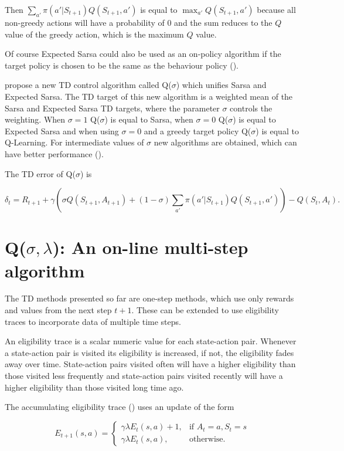 \documentclass{article} %
\begin{document}
Then $\sum_{a'} \pi(a' | S_{t+1}) Q(S_{t+1}, a')$ is equal to $\max_{a'} Q(S_{t+1}, a')$ because all non-greedy actions will have a probability of 0 and the sum reduces to the $Q$ value of the greedy action, which is the maximum $Q$ value.

Of course Expected Sarsa could also be used as an on-policy algorithm if the target policy is chosen to be the same as the behaviour policy (\cite{expsarsa}).

\cite{sutton2017} propose a new TD control algorithm called Q($\sigma$) which unifies Sarsa and Expected Sarsa. The TD target of this new algorithm is a weighted mean of the Sarsa and Expected Sarsa TD targets, where the parameter $\sigma$ controls the weighting. When $\sigma = 1$ Q($\sigma$) is equal to Sarsa, when $\sigma = 0$ Q($\sigma$) is equal to Expected Sarsa and when using $\sigma = 0$ and a greedy target policy Q($\sigma$) is equal to Q-Learning. For intermediate values of $\sigma$ new algorithms are obtained, which can have better performance (\cite{deasis2017}).

The TD error of Q($\sigma$) is 

\begin{equation} 
\delta_t = R_{t+1} + \gamma ( \sigma Q(S_{t+1}, A_{t+1}) + (1 - \sigma) \sum_{a'} \pi(a' | S_{t+1}) Q(S_{t+1}, a') ) - Q(S_t, A_t).
\end{equation}

\section{Q($\sigma, \lambda$): An on-line multi-step algorithm}

The TD methods presented so far are one-step methods, which use only rewards and values from the next step $t+1$. These can be extended to use eligibility traces to incorporate data of multiple time steps.

An eligibility trace is a scalar numeric value for each state-action pair. Whenever a state-action pair is visited its eligibility is increased, if not, the eligibility fades away over time. State-action pairs visited often will have a higher eligibility than those visited less frequently and state-action pairs visited recently will have a higher eligibility than those visited long time ago.

The accumulating eligibility trace (\cite{eligibility}) uses an update of the form

\begin{equation}
    E_{t+1}(s, a) =
\begin{cases}
    \gamma \lambda E_t(s, a) + 1, & \text{if } A_t = a, S_t = s\\
    \gamma \lambda E_t(s, a) ,    & \text{otherwise.}
\end{cases}
\end{equation}
\end{document}
